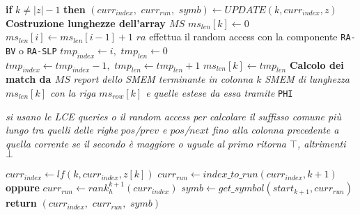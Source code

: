 \begin{algorithm}
\begin{algorithmic}[1]
    \State \textbf{if} $k\neq |z|-1$ \textbf{then} $(curr_{index},\,\,curr_{run},
    \,\,symb)\gets UPDATE(k, curr_{index}, z)$ 
    \EndIf
    \EndIf
    \EndFor
    \For {\textit{every} $k\in[0,|z|)$}
    \Comment \textbf{Costruzione lunghezze dell'array $MS$}
    \State $ms_{len}[k]\gets 0$
    \State $ms_{len}[i]\gets ms_{len}[i-1]+1$
    \Else
    \Comment $ra$ effettua il random access con la componente \texttt{RA-BV} o
    \texttt{RA-SLP} 
    \State $tmp_{index}\gets i,\,\,tmp_{len}\gets 0$
    \State $tmp_{index}\gets tmp_{index}-1,\,\,tmp_{len}\gets tmp_{len}+1$
    \EndWhile
    \State $ms_{len}[k]\gets tmp_{len}$
    \EndIf
    \EndFor
    \For {\textit{every} $k\in[0,|z|)$}
    \Comment \textbf{Calcolo dei match da $MS$}
    \State \textit{report dello SMEM terminante in colonna $k$}
    \State \textit{SMEM di lunghezza $ms_{len}[k]$ con la riga $ms_{row}[k]$ e
    quelle estese da essa tramite} \texttt{PHI}
    \EndIf
    \EndFor
    \EndFunction

    
    \State \textit{si usano le LCE queries o il random access per calcolare il
    suffisso comune più lungo tra quelli delle righe}
    \State \textit{$pos$/$prev$ e
    $pos$/$next$ fino alla colonna precedente a quella corrente} 
    \State \textit{se il secondo è maggiore o uguale al primo ritorna $\top$,
    altrimenti $\bot$} 
    \EndFunction
  \end{algorithmic}
  \caption{\footnotesize{Calcolo degli SMEM con aplotipo esterno con componenti
  \texttt{MAP-INT/BV},
  \texttt{THR-INT/BV} (i cui usi diversificati di entrambe le componenti sono
  segnalati con ``oppure''), \texttt{RA-BV/SLP}, \texttt{PERM} e \texttt{PHI}.}}    
  \label{algo:matchthr}
\end{algorithm}
\begin{algorithm}
  \footnotesize
  \begin{algorithmic}[1]
    \State $curr_{index}\gets lf(k, curr_{index}, z[k])$
    \State $curr_{run}\gets index\_to\_run(curr_{index},k+1)$ \textbf{oppure}
    $curr_{run}\gets rank_h^{k+1}(curr_{index})$
    \State $symb\gets get\_symbol(start_{k+1}, curr_{run})$
    \State \textbf{return} $(curr_{index},\,\,curr_{run},\,\,symb)$
    \EndFunction
  \end{algorithmic}
  \caption{Algoritmo per l'update con componenti \texttt{MAP-INT} e
  \texttt{MAP-BV}.} 
  \label{algo:updatems}
\end{algorithm}
